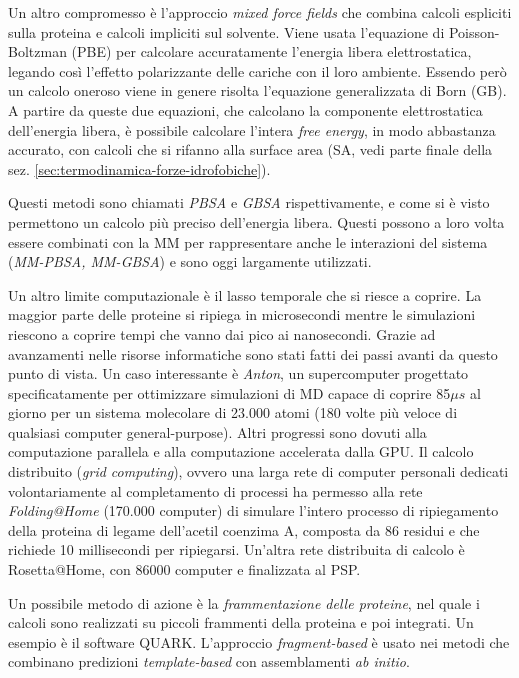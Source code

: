 {\par Un altro compromesso è l'approccio \textit{mixed force fields} che combina calcoli espliciti sulla proteina e calcoli impliciti sul solvente. Viene usata l'equazione di Poisson-Boltzman (PBE) per calcolare accuratamente l'energia libera elettrostatica, legando così l'effetto polarizzante delle cariche con il loro ambiente. Essendo però un calcolo oneroso viene in genere risolta l'equazione generalizzata di Born (GB). A partire da queste due equazioni, che calcolano la componente elettrostatica dell'energia libera, è possibile calcolare l'intera \textit{free energy}, in modo abbastanza accurato, con calcoli che si rifanno alla surface area (SA, vedi parte finale della sez. \ref{sec:termodinamica-forze-idrofobiche}). 

\par Questi metodi sono chiamati \textit{PBSA} e \textit{GBSA} rispettivamente, e come si è visto permettono un calcolo più preciso dell'energia libera. Questi possono a loro volta essere combinati con la MM per rappresentare anche le interazioni del sistema (\textit{MM-PBSA, MM-GBSA}) e sono oggi largamente utilizzati.

\par Un altro limite computazionale è il lasso temporale che si riesce a coprire. La maggior parte delle proteine si ripiega in microsecondi mentre le simulazioni riescono a coprire tempi che vanno dai pico ai nanosecondi. Grazie ad avanzamenti nelle risorse informatiche sono stati fatti dei passi avanti da questo punto di vista. Un caso interessante è \textit{Anton}, un supercomputer progettato specificatamente per ottimizzare simulazioni di MD capace di coprire 85$\mu s$ al giorno per un sistema molecolare di 23.000 atomi (180 volte più veloce di qualsiasi computer general-purpose). Altri progressi sono dovuti alla computazione parallela e alla computazione accelerata dalla GPU. Il calcolo distribuito (\textit{grid computing}), ovvero una larga rete di computer personali dedicati volontariamente al completamento di processi ha permesso alla rete \textit{Folding@Home} (170.000 computer) di simulare l'intero processo di ripiegamento della proteina di legame dell'acetil coenzima A, composta da 86 residui e che richiede 10 millisecondi per ripiegarsi. Un'altra rete distribuita di calcolo è Rosetta@Home, con 86000 computer e finalizzata al PSP. \\

\par Un possibile metodo di azione è la \textit{frammentazione delle proteine}, nel quale i calcoli sono realizzati su piccoli frammenti della proteina e poi integrati. Un esempio è il software QUARK. L'approccio \textit{fragment-based} è usato nei metodi che combinano predizioni \textit{template-based} con assemblamenti \textit{ab initio}.

}
